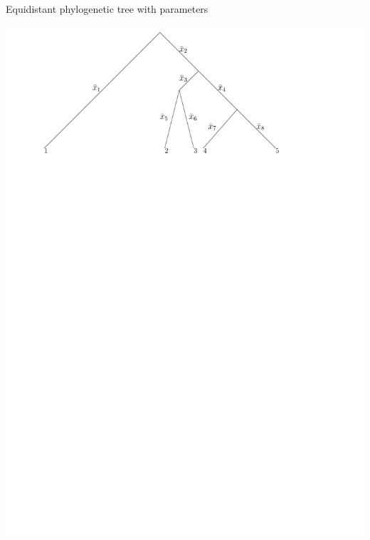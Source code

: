 \documentclass{beamer}
\theoremstyle{example}
\begin{document}
\begin{frame}{Equidistant phylogenetic tree with parameters}
\begin{definition}
\includegraphics[width=\framewidth]{rooted_time_parameters}
\end{definition}
\end{frame}
\end{document}
